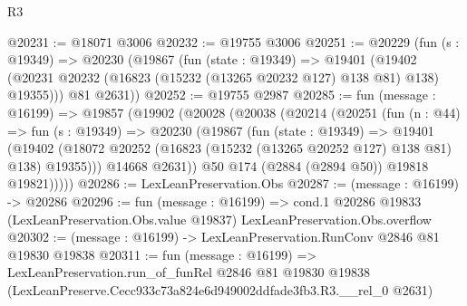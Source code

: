 \begin{lexlean}{R3}
\begin{coremodule}
@20231 := @18071 @3006
@20232 := @19755 @3006
@20251 := @20229
    (fun (s : @19349) =>
    @20230
      (@19867
        (fun (state : @19349) =>
        @19401 (@19402 (@20231 @20232 (@16823 (@15232 (@13265 @20232 @127) @138 @81) @138) @19355)))
        @81
        @2631))
@20252 := @19755 @2987
@20285 := fun (message : @16199) =>
  @19857
    (@19902
      (@20028
        (@20038
          (@20214
            (@20251
              (fun (n : @44) =>
              fun (s : @19349) =>
              @20230
                (@19867
                  (fun (state : @19349) =>
                  @19401
                    (@19402
                      (@18072 @20252 (@16823 (@15232 (@13265 @20252 @127) @138 @81) @138) @19355)))
                  @14668
                  @2631))
              @50
              @174
              (@2884 (@2894 @50))
              @19818
              @19821)))))
@20286 := LexLeanPreservation.Obs
@20287 := (message : @16199) -> @20286
@20296 := fun (message : @16199) =>
  cond.{1} @20286 @19833 (LexLeanPreservation.Obs.value @19837) LexLeanPreservation.Obs.overflow
@20302 := (message : @16199) -> LexLeanPreservation.RunConv @2846 @81 @19830 @19838
@20311 := fun (message : @16199) =>
  LexLeanPreservation.run_of_funRel
    @2846
    @81
    @19830
    @19838
    (LexLeanPreserve.Cecc933c73a824e6d949002ddfade3fb3.R3.__rel_0 @2631)
\end{coremodule}
\end{lexlean}
